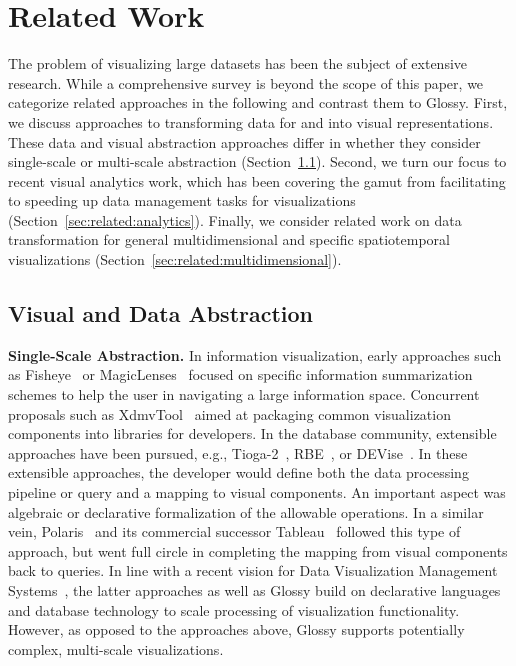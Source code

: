 \documentclass[11pt, oneside]{report}
\newcommand{\minisec}[1]{\noindent\textbf{#1.}}
\begin{document}
{\begin{enumerate}
\end{enumerate} 

\section{Related Work}
\label{sec:glossy:related:work}

The problem of visualizing large datasets has been the subject of extensive research. While a comprehensive survey is beyond the scope of this paper, we categorize related approaches in the following and contrast them to Glossy. First, we discuss approaches to transforming data for and into visual representations. These data and visual abstraction approaches differ in whether they consider single-scale or multi-scale abstraction (Section~\ref{sec:related:abstraction}). Second, we turn our focus to recent visual analytics work, which has been covering the gamut from facilitating to speeding up data management tasks for visualizations (Section~\ref{sec:related:analytics}). Finally, we consider related work on data transformation for general multidimensional and specific spatiotemporal visualizations (Section~\ref{sec:related:multidimensional}). 

\subsection{Visual and Data Abstraction}
\label{sec:related:abstraction}

\minisec{Single-Scale Abstraction}
In information visualization, early approaches such as Fisheye~\cite{sarkar1994fisheye} or MagicLenses~\cite{bier1993magiclenses} focused on specific information summarization schemes to help the user in navigating a large information space. Concurrent proposals such as XdmvTool~\cite{ward1994xmdvtool} aimed at packaging common visualization components into libraries for developers. In the database community, extensible approaches have been pursued, e.g., Tioga-2~\cite{aiken1996tioga2}, RBE~\cite{krishnamurthy1995rbe}, or DEVise~\cite{livny1997devise}. In these extensible approaches, the developer would define both the data processing pipeline or query and a mapping to visual components. An important aspect was algebraic or declarative formalization of the allowable operations. In a similar vein, Polaris~\cite{stolte2008polaris} and its commercial successor Tableau~\cite{wesley2011tableau} followed this type of approach, but went full circle in completing the mapping from visual components back to queries. In line with a recent vision for Data Visualization Management Systems~\cite{wu2014case}, the latter approaches as well as Glossy build on declarative languages and database technology to scale processing of visualization functionality. However, as opposed to the approaches above, Glossy supports potentially complex, multi-scale visualizations.  

}
\end{document}
